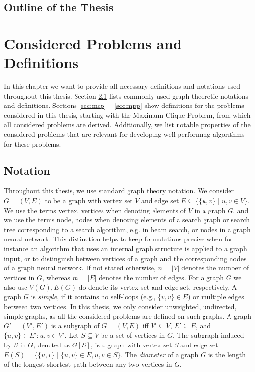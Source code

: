 \documentclass[draft,final]{vutinfth} %
\begin{document}
\section{Outline of the Thesis}

\chapter{Considered Problems and Definitions}

In this chapter we want to provide all necessary definitions and notations used throughout this thesis. Section \ref{sec:notation} lists commonly used graph theoretic notations and definitions. Sections \ref{sec:mcp} -- \ref{sec:mpp} show definitions for the problems considered in this thesis, starting with the Maximum Clique Problem, from which all considered problems are derived. Additionally, we list notable properties of the considered problems that are relevant for developing well-performing algorithms for these problems. 

\section{Notation}\label{sec:notation}

Throughout this thesis, we use standard graph theory notation. 
We consider $G = (V, E)$ to be a graph with vertex set $V$ and edge set $E \subseteq \{\{u,v\} \mid u,v \in V\}$. We use the terms vertex, vertices when denoting elements of $V$ in a graph $G$, and we use the terms node, nodes when denoting elements of a search graph or search tree corresponding to a search algorithm, e.g. in beam search, or nodes in a graph neural network. This distinction helps to keep formulations precise when for instance an algorithm that uses an internal graph structure is applied to a graph input, or to distinguish between vertices of a graph and the corresponding nodes of a graph neural network. 
If not stated otherwise, $n = |V|$ denotes the number of vertices in $G$, whereas $m = |E|$ denotes the number of edges. 
For a graph $G$ we also use $V(G), E(G)$ do denote its vertex set and edge set, respectively. 
A graph $G$ is \emph{simple}, if it contains no self-loops (e.g.,  $\{v,v\} \in E$) or multiple edges between two vertices. In this thesis, we only consider unweighted, undirected, simple graphs, as all the considered problems are defined on such graphs. 
A graph $G' = (V', E')$ is a subgraph of $G = (V,E)$ iff $V' \subseteq V$, $E' \subseteq E$, and $\{u,v\} \in E' \colon u,v \in V'$. Let $S \subseteq V$ be a set of vertices in $G$. The subgraph induced by $S$ in $G$, denoted as $G[S]$, is a graph with vertex set $S$ and edge set $E(S) = \{ \{u,v\} \mid \{u,v\} \in E, u,v \in S \}$. 
The \emph{diameter} of a graph $G$ is the length of the longest shortest path between any two vertices in $G$. 
\end{document}
